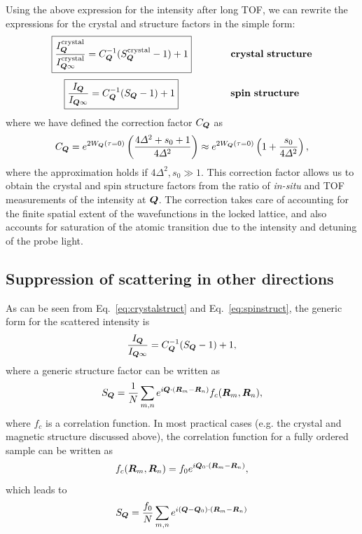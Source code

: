 Using the above expression for the intensity after long TOF, we can rewrite the
expressions for the crystal and structure factors in the simple form:
\vspace{0.3em}
\begin{equation} 
\boxed{
  \frac{ I_{\bm{Q}}^{\mathrm{crystal}} }{ I_{\bm{Q}\infty}^{\mathrm{crystal}}} =
   C_{\bm{Q}}^{-1}  ( S_{\bm{Q}}^{\mathrm{crystal}} -1 ) + 1  }
  ~~~~~~~~~~~~\mathbf{crystal\ structure}
\label{eq:crystalstruct}
\end{equation} 
\begin{equation} 
\boxed{
  \frac{ I_{\bv{Q}} }{ I_{\bv{Q}\infty}} = 
   C_{\bv{Q}}^{-1}  ( \sq -1 ) + 1   }
  ~~~~~~~~~~~~~~~~\mathbf{spin\ structure}
\vspace{0.8em}
\label{eq:spinstruct}
\end{equation} 
where we have defined the correction factor $C_{\bm{Q}}$ as 
\begin{equation}
  C_{\bm{Q}} = e^{2W_{\bm{Q}}(\tau=0) }\left( \frac{ 4\Delta^{2} +  s_{0}  +
1}{ 4 \Delta^{2} } \right) \approx e^{2W_{\bm{Q}}(\tau=0) }\left( 1 + \frac{
s_{0} }{ 4 \Delta^{2} } \right),
\label{eq:defineCq}
\end{equation}
where the approximation holds if $4\Delta^{2},s_{0} \gg 1$.  This correction
factor allows us to obtain the crystal and spin structure factors from the
ratio of \textit{in-situ} and TOF measurements of the intensity at $\bm{Q}$.
The correction takes care of accounting for the finite spatial extent of the
wavefunctions in the locked lattice, and also accounts for saturation of the
atomic transition due to the intensity and detuning of the probe light.  
 

\subsection{ Suppression of scattering in other directions}
\label{subsec:suppress}

As can be seen from Eq.~\ref{eq:crystalstruct} and Eq.~\ref{eq:spinstruct}, the
generic form for the scattered intensity is 
\begin{equation}
  \frac{ I_{\bm{Q}} }{ I_{\bm{Q}\infty}} = 
   C_{\bm{Q}}^{-1}  ( S_{\bm{Q}} -1 ) + 1 ,
\end{equation}
where a generic structure factor can be written as
\begin{equation}
 S_{\bm{Q}} = \frac{1}{N} 
  \sum_{m,n} 
  e^{i\bm{Q}\cdot(\bm{R}_{m} - \bm{R}_{n})} f_{c}(\bm{R}_{m}, \bm{R}_{n}),
\end{equation}
where $f_{c}$ is a correlation function.  In most practical cases (e.g. the crystal and magnetic structure discussed above), the correlation function for a fully ordered sample can be written as 
\begin{equation}  
  f_{c}(\bm{R}_{m}, \bm{R}_{n}) = 
  f_{0} e^{i\bm{Q}_{0} \cdot(\bm{R}_{m} - \bm{R}_{n})} ,
\end{equation}
which leads to
\begin{equation}
 S_{\bm{Q}} = \frac{f_{0}}{N} \sum_{m,n}
e^{i(\bm{Q}-\bm{Q}_{0})\cdot(\bm{R}_{m} - \bm{R}_{n})} 
\end{equation}

